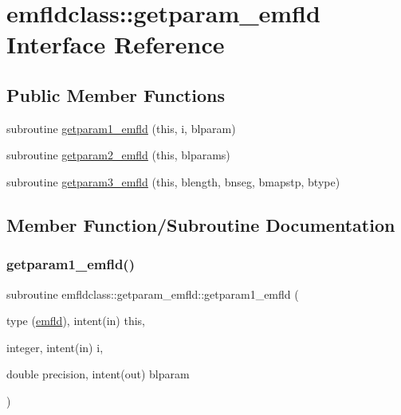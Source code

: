 \hypertarget{interfaceemfldclass_1_1getparam__emfld}{}\section{emfldclass\+::getparam\+\_\+emfld Interface Reference}
\label{interfaceemfldclass_1_1getparam__emfld}
\subsection*{Public Member Functions}
\begin{DoxyCompactItemize}
\item 
subroutine \mbox{\hyperlink{interfaceemfldclass_1_1getparam__emfld_aed707689648e6ac403dda790f63af811}{getparam1\+\_\+emfld}} (this, i, blparam)
\item 
subroutine \mbox{\hyperlink{interfaceemfldclass_1_1getparam__emfld_aae88564a44a9c847267fc62e40ae1b8c}{getparam2\+\_\+emfld}} (this, blparams)
\item 
subroutine \mbox{\hyperlink{interfaceemfldclass_1_1getparam__emfld_a938f7c1ed0d9e62772ab58826827fd7d}{getparam3\+\_\+emfld}} (this, blength, bnseg, bmapstp, btype)
\end{DoxyCompactItemize}


\subsection{Member Function/\+Subroutine Documentation}
\mbox{\label{interfaceemfldclass_1_1getparam__emfld_aed707689648e6ac403dda790f63af811}} 
\subsubsection{\texorpdfstring{getparam1\_emfld()}{getparam1\_emfld()}}
{\footnotesize\ttfamily subroutine emfldclass\+::getparam\+\_\+emfld\+::getparam1\+\_\+emfld (\begin{DoxyParamCaption}\item[{type (\mbox{\hyperlink{namespaceemfldclass_structemfldclass_1_1emfld}{emfld}}), intent(in)}]{this,  }\item[{integer, intent(in)}]{i,  }\item[{double precision, intent(out)}]{blparam }\end{DoxyParamCaption})}

